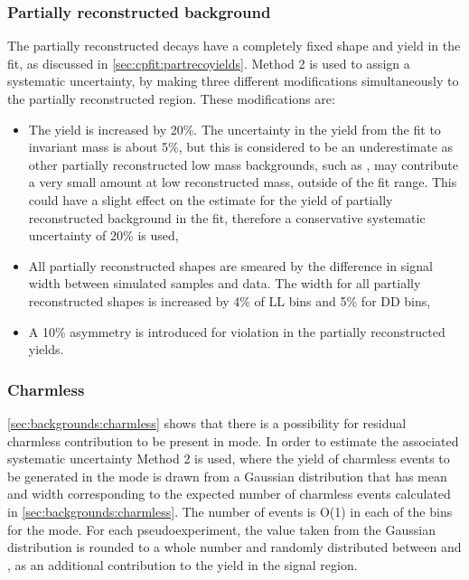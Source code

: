 \subsubsection{Partially reconstructed background}
\label{sec:systematics:partreco}

The partially reconstructed decays have a completely fixed shape and yield in the \CP fit, as discussed in \sect\ref{sec:cpfit:partrecoyields}. Method 2 is used to assign a systematic uncertainty, by making three different modifications simultaneously to the partially reconstructed region. These modifications are:

\begin{itemize}
\item The yield is increased by 20\%. The uncertainty in the yield from the fit to \kpi invariant mass is about 5\%, but this is considered to be an underestimate as other partially reconstructed low mass backgrounds, such as \decay{\Bm}{\D\Kstarm\piz}, may contribute a very small amount at low reconstructed \Bm mass, outside of the \CP fit range. This could have a slight effect on the estimate for the yield of partially reconstructed background in the \CP fit, therefore a conservative systematic uncertainty of 20\% is used,
\item All partially reconstructed shapes are smeared by the difference in signal width between simulated samples and data. The width for all partially reconstructed shapes is increased by 4\% of LL bins and 5\% for DD bins,
\item A 10\% asymmetry is introduced for \CP violation in the partially reconstructed yields.
\end{itemize}

\subsubsection{Charmless}

\Sect\ref{sec:backgrounds:charmless} shows that there is a possibility for residual charmless contribution to be present in \pipi mode. In order to estimate the associated systematic uncertainty Method 2 is used, where the yield of charmless events to be generated in the \pipi mode is drawn from a Gaussian distribution that has mean and width corresponding to the expected number of charmless events calculated in \sect\ref{sec:backgrounds:charmless}. The number of events is O(1) in each of the bins for the \pipi mode. For each pseudoexperiment, the value taken from the Gaussian distribution is rounded to a whole number and randomly distributed between \Bp and \Bm, as an additional contribution to the yield in the signal region. 

